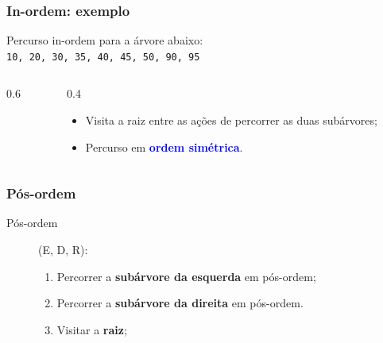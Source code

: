 \documentclass{beamer}
\newcommand{\tcb}[1]{\textcolor{blue}{\textbf{#1}}}
\begin{document}
\begin{frame}
  \frametitle{In-ordem: exemplo}

  Percurso in-ordem para a árvore abaixo:\\
  \texttt{10, 20, 30, 35, 40, 45, 50, 90, 95}
  
  \vspace{1cm}

  \begin{columns}
    \begin{column}{0.6\textwidth}

      \centering
    \end{column}
    \begin{column}{0.4\textwidth}
      \begin{itemize}
        \item Visita a raiz entre as ações de percorrer as duas subárvores;
        \item Percurso em \tcb{ordem simétrica}.
      \end{itemize}
    \end{column}
  \end{columns}

\end{frame}


\begin{frame}
  \frametitle{Pós-ordem}

  \begin{description}
    \item [Pós-ordem] (E, D, R):
    \begin{enumerate}
      \item Percorrer a \textbf{subárvore da esquerda} em pós-ordem;
      \item Percorrer a \textbf{subárvore da direita} em pós-ordem.
      \item Visitar a \textbf{raiz};
    \end{enumerate}
  \end{description}
  
\end{frame}
\end{document}
